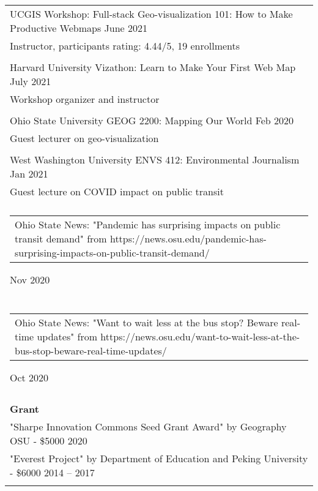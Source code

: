 \documentclass[letterpaper, 11pt]{article}
\begin{document}
\begin{longtable}{p{6.5in}}
UCGIS Workshop: Full-stack Geo-visualization 101: How to Make Productive Webmaps \hfill June 2021 \\
Instructor, participants rating: 4.44/5, 19 enrollments \\\\

Harvard University Vizathon: Learn to Make Your First Web Map \hfill July 2021\\
Workshop organizer and instructor \\\\

Ohio State University GEOG 2200: Mapping Our World \hfill Feb 2020\\
Guest lecturer on geo-visualization \\\\

West Washington University ENVS 412: Environmental Journalism \hfill Jan 2021\\
Guest lecture on COVID impact on public transit \\\\

\begin{tabular}{p{5in}}
Ohio State News: "Pandemic has surprising impacts on public transit demand" from https://news.osu.edu/pandemic-has-surprising-impacts-on-public-transit-demand/
\end{tabular} \hfill Nov 2020 \\\\

\begin{tabular}{p{5in}}
Ohio State News: "Want to wait less at the bus stop? Beware real-time updates" from https://news.osu.edu/want-to-wait-less-at-the-bus-stop-beware-real-time-updates/ 
\end{tabular} \hfill Oct 2020 \\\\

\textbf{Grant} \\
"Sharpe Innovation Commons Seed Grant Award" by Geography OSU - \$5000 \hfill 2020 \\
"Everest Project" by Department of Education and Peking University - \$6000 \hfill 2014 -- 2017 \\\\


\end{longtable}
\end{document}
